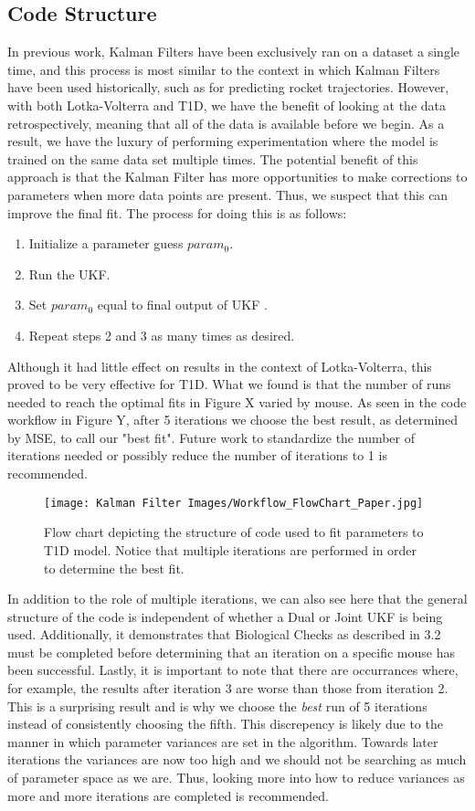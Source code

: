 \subsection{Code Structure}
In previous work, Kalman Filters have been exclusively ran on a dataset a single time, and this process is most similar to the context in which Kalman Filters have been used historically, such as for predicting rocket trajectories. However, with both Lotka-Volterra and T1D, we have the benefit of looking at the data retrospectively, meaning that all of the data is available before we begin. As a result, we have the luxury of performing experimentation where the model is trained on the same data set multiple times. The potential benefit of this approach is that the Kalman Filter has more opportunities to make corrections to parameters when more data points are present. Thus, we suspect that this can improve the final fit. The process for doing this is as follows:
\begin{enumerate}
    \item Initialize a parameter guess $param_0$.
    \item Run the UKF.
    \item Set $param_0$ equal to final output of UKF .
    \item Repeat steps 2 and 3 as many times as desired.
\end{enumerate}
Although it had little effect on results in the context of Lotka-Volterra, this proved to be very effective for T1D. What we found is that the number of runs needed to reach the optimal fits in Figure X varied by mouse. As seen in the code workflow in Figure Y, after 5 iterations we choose the best result, as determined by MSE, to call our "best fit". Future work to standardize the number of iterations needed or possibly reduce the number of iterations to 1 is recommended.
\begin{figure}[H]
    \centering
    \texttt{[image: Kalman Filter Images/Workflow\_FlowChart\_Paper.jpg]}
    \caption{Flow chart depicting the structure of code used to fit parameters to T1D model. Notice that multiple iterations are performed in order to determine the best fit.}
\end{figure}
In addition to the role of multiple iterations, we can also see here that the general structure of the code is independent of whether a Dual or Joint UKF is being used. Additionally, it demonstrates that Biological Checks as described in 3.2 must be completed before determining that an iteration on a specific mouse has been successful. Lastly, it is important to note that there are occurrances where, for example, the results after iteration 3 are worse than those from iteration 2. This is a surprising result and is why we choose the \emph{best} run of 5 iterations instead of consistently choosing the fifth. This discrepency is likely due to the manner in which parameter variances are set in the algorithm. Towards later iterations the variances are now too high and we should not be searching as much of parameter space as we are. Thus, looking more into how to reduce variances as more and more iterations are completed is recommended.\\
